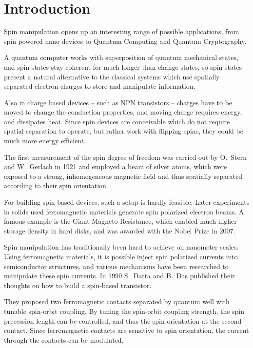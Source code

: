 \chapter{Introduction}

Spin manipulation opens up an interesting range of possible applications, from
spin powered nano devices to Quantum Computing and Quantum Cryptography.

A quantum computer works with superposition of quantum mechanical states, and
spin states stay coherent for much longer than change states, so spin states
present a natural alternative to the classical systems which use spatially
separated electron charges to store and manipulate information.

Also in charge based devices -- such as NPN transistors -- charges have to be
moved to change the conduction properties, and moving charge requires energy,
and dissipates heat. Since spin devices are conceivable which do not require
spatial separation to operate, but rather work with flipping spins, they could
be much more energy efficient.

The first measurement of the spin degree of freedom was carried out by O.~Stern
and W.~Gerlach in 1921 \cite{stern-gerlach} and employed a beam of silver atoms,
which were
exposed to a strong, inhomogeneous magnetic field and thus spatially separated
according to their spin orientation.

For building spin based devices, such a setup is hardly feasible. Later
experiments in solids used ferromagnetic materials generate spin polarized
electron beams. A famous example is the Giant Magneto Resistance, which
enabled much higher storage density in hard disks, and was awarded with the
Nobel Prize in 2007.

Spin manipulation has traditionally been hard to achieve on nanometer
scales. Using ferromagnetic materials, it is possible inject spin polarized
currents into semiconductor structures, and various mechanisms have been
researched to manipulate these spin currents. In 1990 S.~Datta and B.~Das
published their thoughts on how to build a spin-based
transistor\cite{datta-das}.

They proposed two ferromagnetic contacts separated
by quantum well with tunable spin-orbit coupling. By tuning the spin-orbit
coupling strength, the spin precession length can be controlled, and thus the
spin orientation at the second contact. Since ferromagnetic contacts are
sensitive to spin orientation, the current through the contacts can be
modulated.


